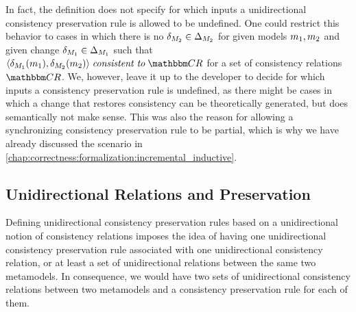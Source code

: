 In fact, the definition does not specify for which inputs a unidirectional consistency preservation rule is allowed to be undefined.
One could restrict this behavior to cases in which there is no $\delta_{M_{2}} \in \Delta_{M_{2}}$ for given models $m_{1},m_{2}$ and given change $\delta_{M_{1}} \in \Delta_{M_{1}}$ such that $\tupled{\change{\metamodel{M}{1}}(\model{m}{1}), \change{\metamodel{M}{2}}(\model{m}{2})} \consistenttomath \consistencyrelationset{CR}$ for a set of consistency relations $\consistencyrelationset{CR}$.
We, however, leave it up to the developer to decide for which inputs a consistency preservation rule is undefined, as there might be cases in which a change that restores consistency can be theoretically generated, but does semantically not make sense.
This was also the reason for allowing a synchronizing consistency preservation rule to be partial, which is why we have already discussed the scenario in \autoref{chap:correctness:formalization:incremental_inductive}.


\subsection{Unidirectional Relations and Preservation} %
\label{chap:synchronization:gap:alignment}

Defining unidirectional consistency preservation rules based on a unidirectional notion of consistency relations imposes the idea of having one unidirectional consistency preservation rule associated with one unidirectional consistency relation, or at least a set of unidirectional relations between the same two metamodels.
In consequence, we would have two sets of unidirectional consistency relations between two metamodels and a consistency preservation rule for each of them.

